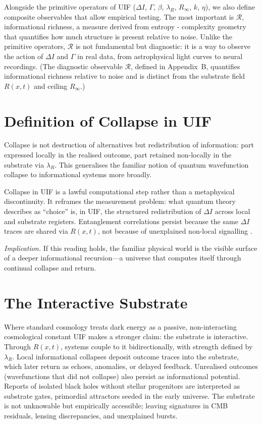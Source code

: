 Alongside the primitive operators of UIF ($\Delta I$, $\Gamma$, $\beta$, $\lambda_R$, $R_\infty$, $k$, $\eta$), we also define composite observables that allow empirical testing. The most important is $\mathcal{R}$, informational richness, a measure derived from entropy - complexity geometry that quantifies how much structure is present relative to noise. Unlike the primitive operators, $\mathcal{R}$ is not fundamental but diagnostic: it is a way to observe the action of $\Delta I$ and $\Gamma$ in real data, from astrophysical light curves to neural recordings.
(The diagnostic observable $\mathcal{R}$, defined in Appendix~B, quantifies informational richness relative to noise
and is distinct from the substrate field $R(x,t)$ and ceiling $R_{\infty}$.)


\section{Definition of Collapse in UIF}
Collapse is not destruction of alternatives but redistribution of information: part expressed locally in the realised outcome, part retained non-locally in the substrate via $\lambda_R$. This generalises the familiar notion of quantum wavefunction collapse to informational systems more broadly.

Collapse in UIF is a lawful computational step rather than a metaphysical discontinuity. It reframes the measurement problem: what quantum theory describes as ``choice'' is, in UIF, the structured redistribution of $\Delta I$ across local and substrate registers. Entanglement
correlations persist because the same $\Delta I$ traces are shared via  $R(x,t)$, not because of
unexplained non-local signalling \cite{Bell1964,Aspect1982}.

\noindent
\textit{Implication.} If this reading holds, the familiar physical world is the
visible surface of a deeper informational recursion—a universe that computes
itself through continual collapse and return.


\section{The Interactive Substrate}

Where standard cosmology treats dark energy as a passive, non-interacting cosmological
constant \cite{Riess1998,Perlmutter1999,Planck2018} UIF makes a stronger claim: the substrate is interactive. Through $R(x,t)$, systems couple to it bidirectionally, with strength defined by  $\lambda_R$. Local informational collapses deposit outcome traces into the substrate, which later return as echoes, anomalies, or delayed feedback. Unrealised outcomes (wavefunctions that did not collapse) also persist as informational potential. Reports of isolated black holes without stellar progenitors \cite{Mroz2022} are interpreted as substrate gates, primordial attractors seeded in the early universe. The substrate is not unknowable but empirically accessible; leaving signatures in CMB residuals, lensing discrepancies, and unexplained bursts.


